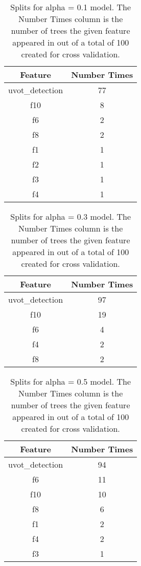 \begin{table}[H]
\begin{center}
\begin{tabular}{cc}
  \hline
Feature & Number Times \\ 
  \hline
uvot\_detection & 77 \\ 
  f10 & 8 \\ 
  f6 & 2 \\ 
  f8 & 2 \\ 
  f1 & 1 \\ 
  f2 & 1 \\ 
  f3 & 1 \\ 
  f4 & 1 \\ 
   \hline
\end{tabular}
\caption{Splits for alpha = 0.1 model. The Number Times column is the number of trees the given feature appeared in out of a total of 100 created for cross validation.}
\end{center}
\end{table}
\begin{table}[H]
\begin{center}
\begin{tabular}{cc}
  \hline
Feature & Number Times \\ 
  \hline
uvot\_detection & 97 \\ 
  f10 & 19 \\ 
  f6 & 4 \\ 
  f4 & 2 \\ 
  f8 & 2 \\ 
   \hline
\end{tabular}
\caption{Splits for alpha = 0.3 model. The Number Times column is the number of trees the given feature appeared in out of a total of 100 created for cross validation.}
\end{center}
\end{table}
\begin{table}[H]
\begin{center}
\begin{tabular}{cc}
  \hline
Feature & Number Times \\ 
  \hline
uvot\_detection & 94 \\ 
  f6 & 11 \\ 
  f10 & 10 \\ 
  f8 & 6 \\ 
  f1 & 2 \\ 
  f4 & 2 \\ 
  f3 & 1 \\ 
   \hline
\end{tabular}
\caption{Splits for alpha = 0.5 model. The Number Times column is the number of trees the given feature appeared in out of a total of 100 created for cross validation.}
\end{center}
\end{table}
